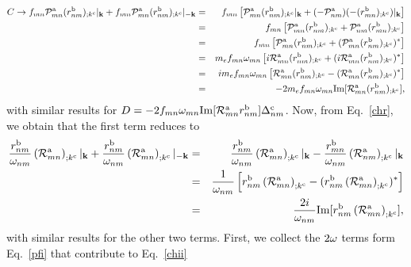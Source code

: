 \documentclass[floatfix,prb,aps,superscriptaddress,11pt,preprint]{revtex4}
\begin{document}
\begin{eqnarray}\label{ct}
C\to f_{mn}{\cal P}^{\mathrm{a}}_{mn}(r^{\mathrm{b}}_{nm})_{;k^{\mathrm{c}}}|_{\mathbf{k}}
+
f_{mn}{\cal P}^{\mathrm{a}}_{mn}(r^{\mathrm{b}}_{nm})_{;k^{\mathrm{c}}}|_{-\mathbf{k}}
&=&
f_{mn}\left[{\cal P}^{\mathrm{a}}_{mn}(r^{\mathrm{b}}_{nm})_{;k^{\mathrm{c}}}|_{\mathbf{k}}
+
(-{\cal P}^{\mathrm{a}}_{nm})(-(r^{\mathrm{b}}_{mn})_{;k^{\mathrm{c}}})|_{\mathbf{k}}
\right]
\nonumber\\
&=&
f_{mn}\left[{\cal P}^{\mathrm{a}}_{mn}(r^{\mathrm{b}}_{nm})_{;k^{\mathrm{c}}}
+
{\cal P}^{\mathrm{a}}_{nm}(r^{\mathrm{b}}_{mn})_{;k^{\mathrm{c}}}
\right]
\nonumber\\
&=&
f_{mn}\left[{\cal P}^{\mathrm{a}}_{mn}(r^{\mathrm{b}}_{nm})_{;k^{\mathrm{c}}}
+
({\cal P}^{\mathrm{a}}_{mn}(r^{\mathrm{b}}_{nm})_{;k^{\mathrm{c}}})^*
\right]
\nonumber\\
&=& 
m_ef_{mn}\omega_{mn}\left[i{\cal R}^{\mathrm{a}}_{mn}(r^{\mathrm{b}}_{nm})_{;k^{\mathrm{c}}}
+
(i{\cal R}^{\mathrm{a}}_{mn}(r^{\mathrm{b}}_{nm})_{;k^{\mathrm{c}}})^*
\right]
\nonumber\\
&=& 
im_ef_{mn}\omega_{mn}\left[{\cal R}^{\mathrm{a}}_{mn}(r^{\mathrm{b}}_{nm})_{;k^{\mathrm{c}}}
-
({\cal R}^{\mathrm{a}}_{mn}(r^{\mathrm{b}}_{nm})_{;k^{\mathrm{c}}})^*
\right]
\nonumber\\
&=& 
-2m_ef_{mn}\omega_{mn}\mathrm{Im}[{\cal R}^{\mathrm{a}}_{mn}(r^{\mathrm{b}}_{nm})_{;k^{\mathrm{c}}}]
,
\end{eqnarray}
with similar results for 
$D=-2f_{mn}\omega_{mn}\mathrm{Im}[{\cal  R}^{\mathrm{a}}_{mn}r^{\mathrm{b}}_{nm}]\Delta^{\mathrm{c}}_{nm}$.
 Now, from Eq.~\eqref{chr}, we obtain
that the first term reduces to
\begin{eqnarray}\label{chrn2}
\frac{r^{\mathrm{b}}_{nm}}{\omega_{nm}}\left({\cal R}^{\mathrm{a}}_{mn}\right)_{;k^{\mathrm{c}}}|_{\mathbf{k}}
+
\frac{r^{\mathrm{b}}_{nm}}{\omega_{nm}}\left({\cal R}^{\mathrm{a}}_{mn}\right)_{;k^{\mathrm{c}}}|_{-\mathbf{k}}
&=&
\frac{r^{\mathrm{b}}_{nm}}{\omega_{nm}}\left({\cal R}^{\mathrm{a}}_{mn}\right)_{;k^{\mathrm{c}}}|_{\mathbf{k}}
-
\frac{r^{\mathrm{b}}_{mn}}{\omega_{nm}}\left({\cal R}^{\mathrm{a}}_{nm}\right)_{;k^{\mathrm{c}}}|_{\mathbf{k}}
\nonumber\\
&=&
\frac{1}{\omega_{nm}}\left[r^{\mathrm{b}}_{nm}\left({\cal R}^{\mathrm{a}}_{mn}\right)_{;k^{\mathrm{c}}}
-
(r^{\mathrm{b}}_{nm}\left({\cal R}^{\mathrm{a}}_{mn}\right)_{;k^{\mathrm{c}}})^*\right]
\nonumber\\
&=&
\frac{2i}{\omega_{nm}}\mathrm{Im}[r^{\mathrm{b}}_{nm}\left({\cal R}^{\mathrm{a}}_{mn}\right)_{;k^{\mathrm{c}}}]
,
\end{eqnarray}
with similar results for the other two terms. First, we collect the
$2\omega$ terms form Eq.~\eqref{pfi} that contribute to Eq.~\eqref{chii}
\end{document}
